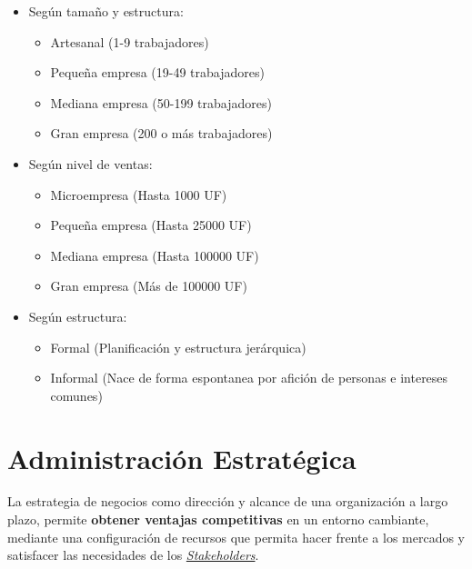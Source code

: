 \documentclass{templateNote}
\begin{document}
\begin{itemize}
\begin{itemize}
        \end{itemize}
    \item Según tamaño y estructura:
        \begin{itemize}
            \item Artesanal (1-9 trabajadores)
            \item Pequeña empresa (19-49 trabajadores)
            \item Mediana empresa (50-199 trabajadores)
            \item Gran empresa (200 o más trabajadores)
        \end{itemize}
    \item Según nivel de ventas:
        \begin{itemize}
            \item Microempresa (Hasta 1000 UF)
            \item Pequeña empresa (Hasta 25000 UF)
            \item Mediana empresa (Hasta 100000 UF)
            \item Gran empresa (Más de 100000 UF)
        \end{itemize}
    \item Según estructura:
        \begin{itemize}
            \item Formal (Planificación y estructura jerárquica)
            \item Informal (Nace de forma espontanea por afición de personas e intereses comunes)   
        \end{itemize}
\end{itemize}
\newpage

\section{Administración Estratégica}
\noindent La estrategia de negocios como dirección y alcance de una organización a largo plazo, permite \textbf{obtener ventajas competitivas} en un entorno cambiante, mediante una configuración
    de recursos que permita hacer frente a los mercados y satisfacer las necesidades de los \hyperlink{stake}{\textit{Stakeholders}}.\\
\end{document}
